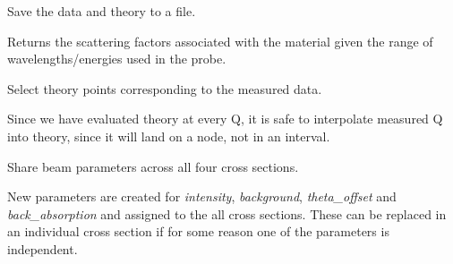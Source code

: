 \documentclass[letterpaper,10pt,english]{sphinxmanual}
\begin{document}
\begin{fulllineitems}
\begin{fulllineitems}
\end{fulllineitems}


\begin{fulllineitems}
\label{api/probe:refl1d.probe.PolarizedNeutronProbe.save}
Save the data and theory to a file.

\end{fulllineitems}


\begin{fulllineitems}
\label{api/probe:refl1d.probe.PolarizedNeutronProbe.scattering_factors}
Returns the scattering factors associated with the material given
the range of wavelengths/energies used in the probe.

\end{fulllineitems}


\begin{fulllineitems}
\label{api/probe:refl1d.probe.PolarizedNeutronProbe.select_corresponding}
Select theory points corresponding to the measured data.

Since we have evaluated theory at every Q, it is safe to interpolate
measured Q into theory, since it will land on a node,
not in an interval.

\end{fulllineitems}


\begin{fulllineitems}
\label{api/probe:refl1d.probe.PolarizedNeutronProbe.shared_beam}
Share beam parameters across all four cross sections.

New parameters are created for \emph{intensity}, \emph{background},
\emph{theta\_offset} and \emph{back\_absorption} and assigned to the all
cross sections.  These can be replaced in an individual
cross section if for some reason one of the parameters is
independent.


\end{fulllineitems}
\end{fulllineitems}
\end{document}
